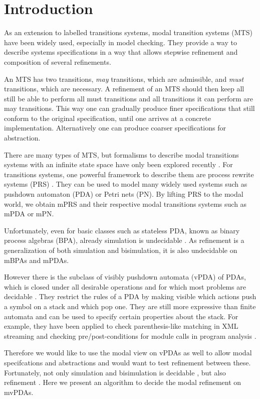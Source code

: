 
\newpage

\chapter{Introduction}

As an extension to labelled transitions systems,
modal transition systems (MTS) \cite{LarsenT88}
have been widely used, especially in model checking.
They provide a way to describe systems specifications
in a way that allows stepwise refinement
and composition of several refinements.

An MTS has two transitions, \emph{may} transitions, which are admissible,
and \emph{must} transitions, which are necessary.
A refinement of an MTS should then keep all still be able to perform
all must transitions and all transitions it can perform are may transitions.
This way one can gradually produce finer specifications that still conform
to the original specification, until one arrives at a concrete implementation.
Alternatively one can produce coarser specifications for abstraction.

There are many types of MTS, 
but formalisms to describe modal transitions systems with
an infinite state space have only been explored recently \cite{BenesK12}.
For transitions systems, one powerful framework to describe them are
process rewrite systems (PRS) \cite{Mayr00, Esparza01}.
They can be used to model many widely used systems
such as pushdown automaton (PDA) or Petri nets (PN).
By lifting PRS to the modal world, we obtain mPRS
and their respective modal transitions systems such as
mPDA or mPN.

Unfortunately, even for basic classes such as
stateless PDA, known as binary process algebras (BPA), already simulation is
undecidable \cite{GrooteH94}.
As refinement is a generalization of both simulation and bisimulation,
it is also undecidable on mBPAs and mPDAs.

However there is the subclass of visibly pushdown automata (vPDA)
of PDAs,
which is closed under all desirable operations
and for which most problems are decidable \cite{AlurM04}.
They restrict the rules of a PDA by making visible which
actions push a symbol on a stack and which pop one.
They are still more expressive than finite automata 
and can be used to specify certain properties about the stack.
For example, they have been applied to check
parenthesis-like matching in XML streaming
\cite{KumarMV07}
and checking pre/post-conditions for module calls
in program analysis \cite{AlurEM04}.

Therefore we would like to use the modal view on vPDAs
as well to allow modal specifcations and abstractions and
would want to test refinement between these.
Fortunately, not only simulation and bisimulation
is decidable \cite{Srba06},
but also refinement \cite{BenesK12}.
Here we present an algorithm to decide the modal refinement on mvPDAs.



